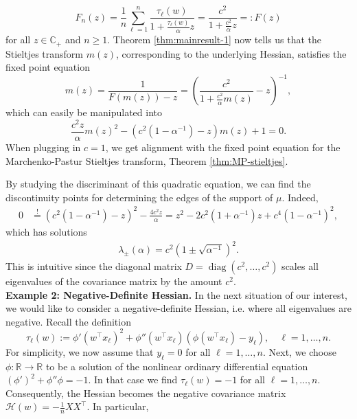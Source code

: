 \documentclass{article}
\begin{document}
\begin{equation}
F_n(z)=\frac{1}{n}\sum_{\ell=1}^n\frac{\tau_\ell(w)}{1+\frac{\tau_\ell(w)}{\alpha}z}=\frac{c^2}{1+\frac{c^2}{\alpha}z}=:F(z)
\end{equation}
for all $z\in\mathbb{C}_+$ and $n\geq1$. Theorem \ref{thm:mainresult-1} now tells us that the Stieltjes transform $m(z)$, corresponding to the underlying Hessian, satisfies the fixed point equation
\begin{equation}
m(z)=\frac{1}{F(m(z))-z}=\left(\frac{c^2}{1+\frac{c^2}{\alpha}m(z)}-z\right)^{-1}, \label{eq:MP-c^2}
\end{equation}
which can easily be manipulated into
\begin{equation}
\frac{c^2z}{\alpha}m(z)^2-(c^2(1-\alpha^{-1})-z)m(z)+1=0. \label{eq:MP-fix}
\end{equation}
When plugging in $c=1$, we get alignment with the fixed point equation for the Marchenko-Pastur Stieltjes transform, Theorem \ref{thm:MP-stieltjes}.
\par
By studying the discriminant of this quadratic equation, we can find the discontinuity points for determining the edges of the support of $\mu$. Indeed,
\begin{align}
0&\stackrel{!}{=}(c^2(1-\alpha^{-1})-z)^2-\frac{4c^2z}{\alpha} = z^2-2c^2(1+\alpha^{-1})z+c^4(1-\alpha^{-1})^2,
\end{align}
which has solutions \begin{align}
\lambda_\pm(\alpha) = c^2(1\pm\sqrt{\alpha^{-1}})^2.
\end{align}
This is intuitive since the diagonal matrix $D=\operatorname{diag}(c^2,\dots,c^2)$ scales all eigenvalues of the covariance matrix by the amount $c^2$.
\bigskip
\bigskip
\\
\textbf{Example 2: Negative-Definite Hessian.} In the next situation of our interest, we would like to consider a negative-definite Hessian, i.e. where all eigenvalues are negative. Recall the definition
\begin{equation}
\tau_\ell(w):=\phi'(w^\top x_\ell)^2+\phi''(w^\top x_\ell)(\phi(w^\top x_\ell)-y_\ell),\quad \ell=1,\dots,n.
\end{equation}
For simplicity, we now assume that $y_\ell=0$ for all $\ell=1,\dots,n$. Next, we choose $\phi:\mathbb{R}\to\mathbb{R}$ to be a solution of the nonlinear ordinary differential equation $(\phi')^2+\phi''\phi=-1$. In that case we find $\tau_\ell(w)=-1$ for all $\ell=1,\dots,n$. Consequently, the Hessian becomes the negative covariance matrix $\mathcal{H}(w)=-\frac{1}{n}XX^\top$. In particular,
\end{document}
